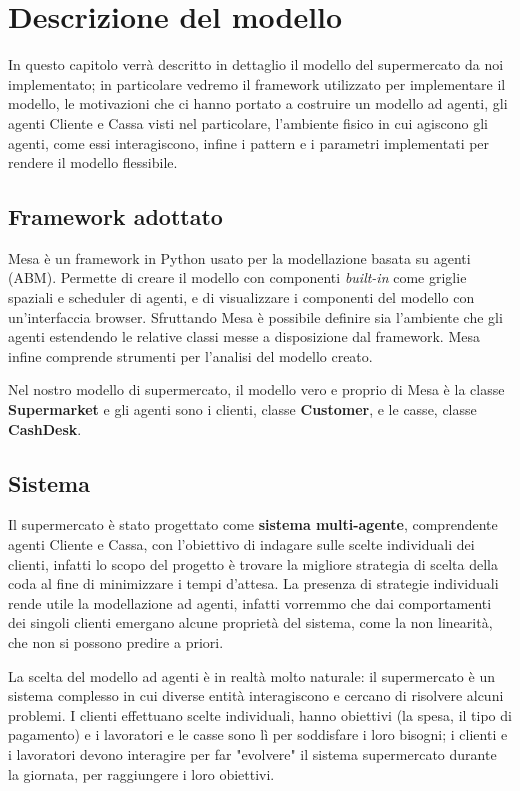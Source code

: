 \chapter{Descrizione del modello}
\label{chapter:model}

In questo capitolo verrà descritto in dettaglio il modello del supermercato da noi implementato; in particolare vedremo il framework utilizzato per implementare il modello, le motivazioni che ci hanno portato a costruire un modello ad agenti, gli agenti Cliente e Cassa visti nel particolare, l'ambiente fisico in cui agiscono gli agenti, come essi interagiscono, infine i pattern e i parametri implementati per rendere il modello flessibile.

\section{Framework adottato}
Mesa \cite{mesa} è un framework in Python usato per la modellazione basata su agenti (ABM). Permette di creare il modello con componenti \textit{built-in} come griglie spaziali e scheduler di agenti, e di visualizzare i componenti del modello con un'interfaccia browser. Sfruttando Mesa è possibile definire sia l'ambiente che gli agenti estendendo le relative classi messe a disposizione dal framework. Mesa infine comprende strumenti per l'analisi del modello creato.

Nel nostro modello di supermercato, il modello vero e proprio di Mesa è la classe \textbf{Supermarket} e gli agenti sono i clienti, classe \textbf{Customer}, e le casse, classe \textbf{CashDesk}. 

\section{Sistema}

Il supermercato è stato progettato come \textbf{sistema multi-agente}, comprendente agenti Cliente e Cassa, con l'obiettivo di indagare sulle scelte individuali dei clienti, infatti lo scopo del progetto è trovare la migliore strategia di scelta della coda al fine di minimizzare i tempi d'attesa. La presenza di strategie individuali rende utile la modellazione ad agenti, infatti vorremmo che dai comportamenti dei singoli clienti emergano alcune proprietà del sistema, come la non linearità, che non si possono predire a priori.

La scelta del modello ad agenti è in realtà molto naturale: il supermercato è un sistema complesso in cui diverse entità interagiscono e cercano di risolvere alcuni problemi. I clienti effettuano scelte individuali, hanno obiettivi (la spesa, il tipo di pagamento) e i lavoratori e le casse sono lì per soddisfare i loro bisogni; i clienti e i lavoratori devono interagire per far "evolvere" il sistema supermercato durante la giornata, per raggiungere i loro obiettivi.

